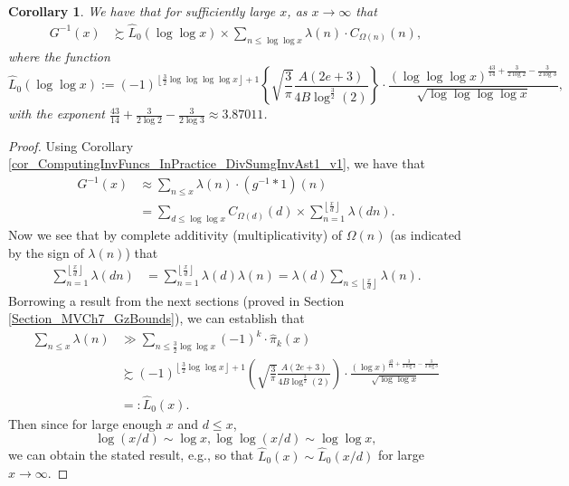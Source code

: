 \documentclass[11pt,reqno,a4letter]{article}
\numberwithin{figure}{section}
\numberwithin{table}{section}
\newcommand{\floor}[1]{\left\lfloor #1 \right\rfloor}
\newcommand{\Floor}[2]{\ensuremath{\left\lfloor \frac{#1}{#2} \right\rfloor}}
\theoremstyle{plain}
\newtheorem{cor}[theorem]{Corollary}
\numberwithin{theorem}{section}
\theoremstyle{definition}
\newcommand{\NBRef}[1]{
     \todo[linecolor=green!85!white,backgroundcolor=orange!50!white,bordercolor=blue!30!black,textcolor=cyan!15!black,shadow,size=\small,fancyline]{
     \color{NBRefColor}{\textbf{#1}
     }
     }
}
\begin{document}
\begin{cor} 
\label{cor_ASemiForm_ForGInvx_v1} 
We have that for sufficiently large $x$, as $x \rightarrow \infty$ that 
\begin{align*} 
G^{-1}(x) & \succsim \widehat{L}_0(\log\log x) \times \sum_{n \leq \log\log x} 
     \lambda(n) \cdot C_{\Omega(n)}(n), 
\end{align*} 
where the function 
\[
\widehat{L}_0(\log\log x) := (-1)^{\floor{\frac{3}{2} \log\log\log\log x} + 1} \left\{ 
     \sqrt{\frac{3}{\pi}} \frac{A (2e+3)}{4B \log^{\frac{3}{2}}(2)}\right\} \cdot 
     \frac{(\log\log\log x)^{\frac{43}{14} + \frac{3}{2 \log 2} - \frac{3}{2 \log 3}}}{ 
     \sqrt{\log\log\log\log x}}, 
\]
with the exponent $\frac{43}{14} + \frac{3}{2 \log 2} - \frac{3}{2 \log 3} \approx 3.87011$. 
\end{cor} 
\NBRef{A10-2020.04-26} 
\begin{proof} 
Using Corollary \ref{cor_ComputingInvFuncs_InPractice_DivSumgInvAst1_v1}, we have that 
\begin{align*} 
G^{-1}(x) & \approx \sum_{n \leq x} \lambda(n) \cdot (g^{-1} \ast 1)(n) \\ 
     & = \sum_{d \leq \log\log x} C_{\Omega(d)}(d) \times \sum_{n=1}^{\Floor{x}{d}} \lambda(dn). 
\end{align*} 
Now we see that by complete additivity (multiplicativity) of $\Omega(n)$ 
(as indicated by the sign of $\lambda(n)$) that 
\begin{align*} 
\sum_{n=1}^{\Floor{x}{d}} \lambda(dn) & = \sum_{n=1}^{\Floor{x}{d}} \lambda(d) \lambda(n) 
     = \lambda(d) \sum_{n \leq \Floor{x}{d}} \lambda(n). 
\end{align*} 
Borrowing a result from the next sections 
(proved in Section \ref{Section_MVCh7_GzBounds}), 
we can establish that 
\begin{align*} 
\sum_{n \leq x} \lambda(n) & \gg \sum_{n \leq \frac{3}{2} \log\log x} (-1)^k \cdot \widehat{\pi}_k(x) \\ 
     & \succsim (-1)^{\floor{\frac{3}{2} \log\log x} + 1} \left( 
     \sqrt{\frac{3}{\pi}} \frac{A (2e+3)}{4B \log^{\frac{3}{2}}(2)}\right) \cdot 
     \frac{(\log x)^{\frac{43}{14} + \frac{3}{2 \log 2} - \frac{3}{2 \log 3}}}{ 
     \sqrt{\log\log x}} \\ 
     & =: \widehat{L}_0(x). 
\end{align*} 
Then since for large enough $x$ and $d \leq x$, 
\[
\log(x/d) \sim \log x, \log\log(x/d) \sim \log\log x, 
\] 
we can obtain the stated result, e.g., so that 
$\widehat{L}_0(x) \sim \widehat{L}_0(x/d)$ for large $x \rightarrow \infty$. 
\end{proof} 
\end{document}
